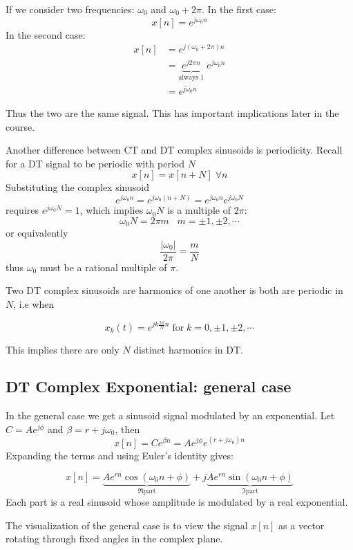 If we consider two frequencies: $\omega_0$ and $\omega_0+2\pi$. In the first case:
\[
x[n] = e^{j\omega_0 n}
\]
In the second case:
\[
\begin{array}{ll}
x[n] &= e^{j(\omega_0+2\pi) n} \\
&= \underbrace{e^{j2\pi n}}_{\text{always 1}}\; e^{j\omega_0 n} \\
&= e^{j\omega_0 n}
\end{array}
\]

Thus the two are the same signal. This has important implications later in the course.

Another difference between CT and DT complex sinusoids is periodicity. Recall for a DT signal to be periodic with period $N$
\[
x[n] = x[n+N] \; \forall n
\]
Substituting the complex sinusoid
\[
e^{j\omega_0 n} = e^{j\omega_0 (n+N)} = e^{j\omega_0 n}e^{j\omega_0 N}
\]
requires $e^{j\omega_0 N} = 1$, which implies $\omega_0 N$ is a multiple of $2\pi$:
\[
\omega_0 N = 2\pi m \;\;\; m = \pm 1, \pm 2, \cdots
\]
or equivalently
\[
\frac{|\omega_0|}{2\pi} = \frac{m}{N}
\]
thus $\omega_0$ must be a rational multiple of $\pi$. 

Two DT complex sinusoids are harmonics of one another is both are periodic in $N$,  i.e when

\[
x_k(t) = e^{jk\frac{2\pi}{N} n} \; \text{for} \; k = 0, \pm 1, \pm 2, \cdots
\]

This implies there are only $N$ distinct harmonics in DT.


\subsection{DT Complex Exponential: general case}

In the general case we get a sinusoid signal modulated by an exponential. Let $C = Ae^{j\phi}$ and $\beta = r + j\omega_0$, then
\[
x[n] = C e^{\beta n} =  Ae^{j\phi} e^{(r+j\omega_0)n}
\]
Expanding the terms and using Euler's identity gives:

\[
x[n] = \underbrace{Ae^{rn}\cos(\omega_0 n+\phi)}_{\Re \text{part}} + j \underbrace{Ae^{rn}\sin(\omega_0 n+\phi)}_{\Im \text{part}}
\]
Each part is a real sinusoid whose amplitude is modulated by a real exponential.

The visualization of the general case is to view the signal $x[n]$ as a vector rotating through fixed angles in the complex plane.

